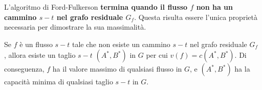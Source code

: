 L'algoritmo di Ford-Fulkerson \textbf{termina quando il flusso $f$ non
  ha un cammino $s-t$ nel grafo residuale $G_f$}. Questa risulta
essere l'unica proprietà necessaria per dimostrare la sua massimalità.

\begin{myblockquote}
  \begin{minipage}{\textwidth}
    \begin{definition}\label{def:7.9}
      Se $f$ è un flusso $s-t$ tale che non esiste un cammino $s-t$ nel
      grafo residuale $G_f$ , allora esiste un taglio $s-t$
      $(A^{*} , B^{*})$ in $G$ per cui $v(f) = c(A^{*} , B^{*})$. Di
      conseguenza, $f$ ha il valore massimo di qualsiasi flusso in $G$, e
      $(A^{*} , B^{*})$ ha la capacità minima di qualsiasi taglio $s-t$ in
      $G$.
    \end{definition}
  \end{minipage}
\end{myblockquote}



